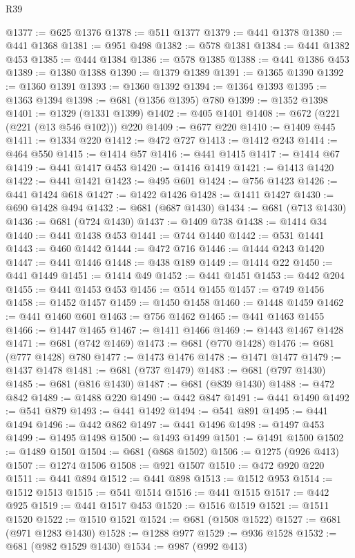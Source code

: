 \begin{lexlean}{R39}
\begin{coremodule}
@1377 := @625 @1376
@1378 := @511 @1377
@1379 := @441 @1378
@1380 := @441 @1368
@1381 := @951 @498
@1382 := @578 @1381
@1384 := @441 @1382 @453
@1385 := @444 @1384
@1386 := @578 @1385
@1388 := @441 @1386 @453
@1389 := @1380 @1388
@1390 := @1379 @1389
@1391 := @1365 @1390
@1392 := @1360 @1391
@1393 := @1360 @1392
@1394 := @1364 @1393
@1395 := @1363 @1394
@1398 := @681 (@1356 @1395) @780
@1399 := @1352 @1398
@1401 := @1329 (@1331 @1399)
@1402 := @405 @1401
@1408 := @672 (@221 (@221 (@13 @546 @102))) @220
@1409 := @677 @220
@1410 := @1409 @445
@1411 := @1334 @220
@1412 := @472 @727
@1413 := @1412 @243
@1414 := @464 @550
@1415 := @1414 @57
@1416 := @441 @1415
@1417 := @1414 @67
@1419 := @441 @1417 @453
@1420 := @1416 @1419
@1421 := @1413 @1420
@1422 := @441 @1421
@1423 := @495 @601
@1424 := @756 @1423
@1426 := @441 @1424 @618
@1427 := @1422 @1426
@1428 := @1411 @1427
@1430 := @690 @1428 @494
@1432 := @681 (@687 @1430)
@1434 := @681 (@713 @1430)
@1436 := @681 (@724 @1430)
@1437 := @1409 @738
@1438 := @1414 @34
@1440 := @441 @1438 @453
@1441 := @744 @1440
@1442 := @531 @1441
@1443 := @460 @1442
@1444 := @472 @716
@1446 := @1444 @243 @1420
@1447 := @441 @1446
@1448 := @438 @189
@1449 := @1414 @22
@1450 := @441 @1449
@1451 := @1414 @49
@1452 := @441 @1451
@1453 := @442 @204
@1455 := @441 @1453 @453
@1456 := @514 @1455
@1457 := @749 @1456
@1458 := @1452 @1457
@1459 := @1450 @1458
@1460 := @1448 @1459
@1462 := @441 @1460 @601
@1463 := @756 @1462
@1465 := @441 @1463 @1455
@1466 := @1447 @1465
@1467 := @1411 @1466
@1469 := @1443 @1467 @1428
@1471 := @681 (@742 @1469)
@1473 := @681 (@770 @1428)
@1476 := @681 (@777 @1428) @780
@1477 := @1473 @1476
@1478 := @1471 @1477
@1479 := @1437 @1478
@1481 := @681 (@737 @1479)
@1483 := @681 (@797 @1430)
@1485 := @681 (@816 @1430)
@1487 := @681 (@839 @1430)
@1488 := @472 @842
@1489 := @1488 @220
@1490 := @442 @847
@1491 := @441 @1490
@1492 := @541 @879
@1493 := @441 @1492
@1494 := @541 @891
@1495 := @441 @1494
@1496 := @442 @862
@1497 := @441 @1496
@1498 := @1497 @453
@1499 := @1495 @1498
@1500 := @1493 @1499
@1501 := @1491 @1500
@1502 := @1489 @1501
@1504 := @681 (@868 @1502)
@1506 := @1275 (@926 @413)
@1507 := @1274 @1506
@1508 := @921 @1507
@1510 := @472 @920 @220
@1511 := @441 @894
@1512 := @441 @898
@1513 := @1512 @953
@1514 := @1512 @1513
@1515 := @541 @1514
@1516 := @441 @1515
@1517 := @442 @925
@1519 := @441 @1517 @453
@1520 := @1516 @1519
@1521 := @1511 @1520
@1522 := @1510 @1521
@1524 := @681 (@1508 @1522)
@1527 := @681 (@971 @1283 @1430)
@1528 := @1288 @977
@1529 := @936 @1528
@1532 := @681 (@982 @1529 @1430)
@1534 := @987 (@992 @413)

\end{coremodule}
\end{lexlean}
